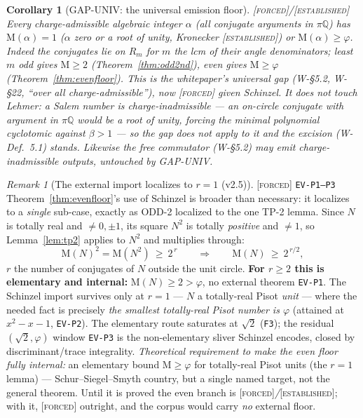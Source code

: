 \documentclass[11pt]{article}
\newcommand{\tagF}{\textcolor{cF}{\textsc{[forced]}}}
\newcommand{\tagE}{\textcolor{cE}{\textsc{[established]}}}
\newcommand{\hx}[1]{\textcolor{cC}{\footnotesize\texttt{#1}}}
\newcommand{\Q}{\mathbb{Q}}
\newcommand{\gp}{\varphi}
\newcommand{\M}{\mathrm{M}}
\theoremstyle{plain}
\newtheorem{corollary}[theorem]{Corollary}
\theoremstyle{definition}
\theoremstyle{remark}
\newtheorem{remark}[theorem]{Remark}
\begin{document}
\begin{corollary}[GAP-UNIV: the universal emission floor]\label{cor:gapuniv}\tagF{}/\tagE{}
Every charge-admissible algebraic integer $\alpha$ (all conjugate arguments in
$\pi\Q$) has $\M(\alpha)=1$ ($\alpha$ zero or a root of unity, Kronecker \tagE{})
or $\M(\alpha)\ge\gp$. Indeed the conjugates lie on $R_m$ for $m$ the lcm of their
angle denominators; least $m$ odd gives $\M\ge2$ (Theorem~\ref{thm:odd2nd}), even
gives $\M\ge\gp$ (Theorem~\ref{thm:evenfloor}). This is the whitepaper's universal
gap (W-\S5.2, W-\S22, ``over all charge-admissible''), now \tagF{} given Schinzel.
\emph{It does not touch Lehmer:} a Salem number is charge-\emph{inadmissible} ---
an on-circle conjugate with argument in $\pi\Q$ would be a root of unity, forcing
the minimal polynomial cyclotomic against $\beta>1$ --- so the gap does not apply
to it and the excision (W-Def.\ 5.1) stands. Likewise the free commutator
(W-\S5.2) may emit charge-inadmissible outputs, untouched by GAP-UNIV.
\end{corollary}

\begin{remark}[The external import localizes to $r=1$ (v2.5)]\label{rem:evenlocalize}\tagF{} \hx{EV-P1--P3}
Theorem~\ref{thm:evenfloor}'s use of Schinzel is broader than necessary: it
localizes to a \emph{single} sub-case, exactly as ODD-2 localized to the one TP-2
lemma. Since $N$ is totally real and $\ne0,\pm1$, its square $N^2$ is totally
\emph{positive} and $\ne1$, so Lemma~\ref{lem:tp2} applies to $N^2$ and multiplies
through:
\[
\M(N)^2=\M(N^2)\ \ge\ 2^{\,r}
\qquad\Longrightarrow\qquad
\M(N)\ \ge\ 2^{\,r/2},
\]
$r$ the number of conjugates of $N$ outside the unit circle. \textbf{For
$r\ge2$ this is elementary and internal:} $\M(N)\ge2>\gp$, no external theorem
\hx{EV-P1}. The Schinzel import survives only at $r=1$ --- $N$ a totally-real
Pisot \emph{unit} --- where the needed fact is precisely \emph{the smallest
totally-real Pisot number is $\gp$} (attained at $x^2-x-1$, \hx{EV-P2}). The
elementary route saturates at $\sqrt2$ (\hx{F3}); the residual $(\sqrt2,\gp)$
window \hx{EV-P3} is the non-elementary sliver Schinzel encodes, closed by
discriminant/trace integrality. \emph{Theoretical requirement to make the even
floor fully internal:} an elementary bound $\M\ge\gp$ for totally-real Pisot units
(the $r=1$ lemma) --- Schur--Siegel--Smyth country, but a single named target, not
the general theorem. Until it is proved the even branch is
\tagF{}\emph{/}\tagE{}; with it, \tagF{} outright, and the corpus would carry
\emph{no} external floor.
\end{remark}
\end{document}
